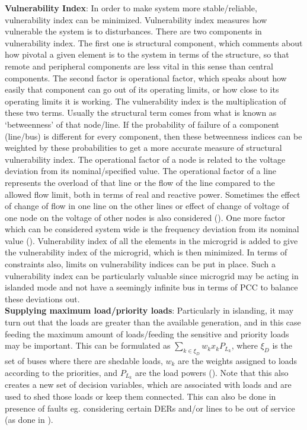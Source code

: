 \textbf{Vulnerability Index}: In order to make system more stable/reliable, vulnerability index can be minimized. Vulnerability index measures how vulnerable the system is to disturbances. There are two components in vulnerability index. The first one is structural component, which comments about how pivotal a given element is to the system in terms of the structure, so that remote and peripheral components are less vital in this sense than central components. The second factor is operational factor, which speaks about how easily that component can go out of its operating limits, or how close to its operating limits it is working. The vulnerability index is the multiplication of these two terms. Usually the structural term comes from what is known as `betweenness' of that node/line. If the probability of failure of a component (line/bus) is different for every component, then these betweenness indices can be weighted by these probabilities to get a more accurate measure of structural vulnerability index. The operational factor of a node is related to the voltage deviation from its nominal/specified value. The operational factor of a line represents the overload of that line or the flow of the line compared to the allowed flow limit, both in terms of real and reactive power. Sometimes the effect of change of flow in one line on the other lines or effect of change of voltage  of one node on the voltage of other nodes is also considered (\citep{mgrj57}). One more factor which can be considered system wide is the frequency deviation from its nominal value (\citep{mgrj16}).  Vulnerability index of all the elements in the microgrid is added to give the vulnerability index of the microgrid, which is then minimized. In terms of constraints also, limits on vulnerability indices can be put in place. Such a vulnerability index can be particularly valuable since microgrid may be acting in islanded mode and not have a seemingly infinite bus in terms of PCC to balance these deviations out.\\
\textbf{Supplying maximum load/priority loads}: Particularly in islanding, it may turn out that the loads are greater than the available generation, and in this case feeding the maximum amount of loads/feeding the sensitive and priority loads may be important. This can be formulated as $\sum\limits_{k\in \xi_D}w_kx_kP_{L_k}$, where $\xi_D$ is the set of buses where there are shedable loads, $w_k$ are the weights assigned to loads according to the priorities, and $P_{L_k}$ are the load powers (\citep{mgrj03}). Note that this also creates a new set of decision variables, which are associated with loads and are used to shed those loads or keep them connected. This can also be done in presence of faults eg. considering certain DERs and/or lines to be out of service (as done in \citep{mgrj01}).\\
